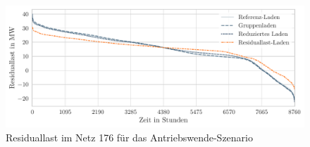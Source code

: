 \begin{figure}[H]
    \centering
    \includegraphics[width=1\textwidth]{Bilder/example_resiual_load}
    \caption{Residuallast im Netz \num{176} für das Antriebswende-Szenario}\label{fig:residual_load}
\end{figure}